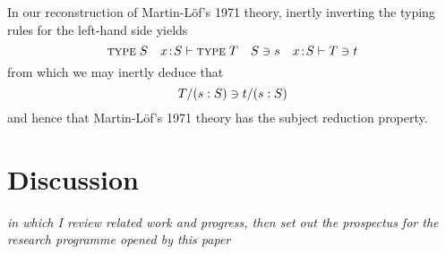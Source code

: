 \documentclass{jfp1}
\newtheorem{definition}[theorem]{Definition}
\newcommand{\GS}[2]{\langle#1\textrm{-}\mathit{#2}\rangle}
\newcommand{\ths}{}
\begin{document}
In our reconstruction of Martin-L\"of's 1971 theory, inertly inverting
the typing rules for the left-hand side yields
\[
  \textsc{type}\;S\quad x\!:\!S\vdash\textsc{type}\;T\quad S \ni s\quad x\!:\!S\vdash T \ni t
\]
from which we may inertly deduce that
\[
  T/(s:S) \ni t/(s:S)
\]
and hence that Martin-L\"of's 1971 theory has the subject reduction property.


\section{Discussion}

\emph{in which I review related work and progress, then set out the prospectus for
the research programme opened by this paper}



\end{document}
